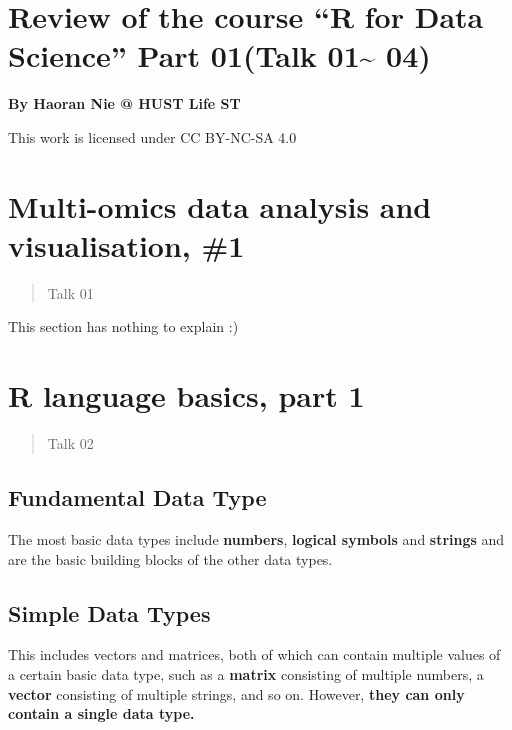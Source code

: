 \documentclass[
]{article}
\author{}
\date{}
\begin{document}
\hypertarget{review-of-the-course-r-for-data-science-part-01talk-01-04}{%
\section{Review of the course ``R for Data Science'' Part 01(Talk
01\textasciitilde{}
04)}\label{review-of-the-course-r-for-data-science-part-01talk-01-04}}

\textbf{By Haoran Nie @ HUST Life ST}

This work is licensed under CC BY-NC-SA 4.0

\hypertarget{multi-omics-data-analysis-and-visualisation-1}{%
\section{Multi-omics data analysis and visualisation,
\#1}\label{multi-omics-data-analysis-and-visualisation-1}}

\begin{quote}
Talk 01
\end{quote}

This section has nothing to explain :)

\hypertarget{r-language-basics-part-1}{%
\section{R language basics, part 1}\label{r-language-basics-part-1}}

\begin{quote}
Talk 02
\end{quote}

\hypertarget{fundamental-data-type}{%
\subsection{Fundamental Data Type}\label{fundamental-data-type}}

The most basic data types include \textbf{numbers}, \textbf{logical
symbols} and \textbf{strings} and are the basic building blocks of the
other data types.

\hypertarget{simple-data-types}{%
\subsection{Simple Data Types}\label{simple-data-types}}

This includes vectors and matrices, both of which can contain multiple
values of a certain basic data type, such as a \textbf{matrix}
consisting of multiple numbers, a \textbf{vector} consisting of multiple
strings, and so on. However, \textbf{they can only contain a single data
type.}
\end{document}
